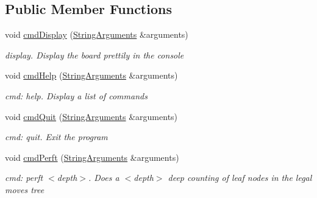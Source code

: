 \subsection*{Public Member Functions}
\begin{DoxyCompactItemize}
\item 
\mbox{\label{classCommandEngine_a76c27f3933326c261d709618d7f996c7}} 
void \hyperlink{classCommandEngine_a76c27f3933326c261d709618d7f996c7}{cmd\+Display} (\hyperlink{structStringArguments}{String\+Arguments} \&arguments)
\begin{DoxyCompactList}\small\item\em display. Display the board prettily in the console \end{DoxyCompactList}\item 
\mbox{\label{classCommandEngine_a1ce6ddfd0eb350cfdde728458329f67d}} 
void \hyperlink{classCommandEngine_a1ce6ddfd0eb350cfdde728458329f67d}{cmd\+Help} (\hyperlink{structStringArguments}{String\+Arguments} \&arguments)
\begin{DoxyCompactList}\small\item\em cmd\+: help. Display a list of commands \end{DoxyCompactList}\item 
\mbox{\label{classCommandEngine_ad82f0bf1cb89f7f43288ce379f97be04}} 
void \hyperlink{classCommandEngine_ad82f0bf1cb89f7f43288ce379f97be04}{cmd\+Quit} (\hyperlink{structStringArguments}{String\+Arguments} \&arguments)
\begin{DoxyCompactList}\small\item\em cmd\+: quit. Exit the program \end{DoxyCompactList}\item 
\mbox{\label{classCommandEngine_ac70f9158e992aa4d7567fa2fe47b09e7}} 
void \hyperlink{classCommandEngine_ac70f9158e992aa4d7567fa2fe47b09e7}{cmd\+Perft} (\hyperlink{structStringArguments}{String\+Arguments} \&arguments)
\begin{DoxyCompactList}\small\item\em cmd\+: perft $<$depth$>$. Does a $<$depth$>$ deep counting of leaf nodes in the legal moves tree \end{DoxyCompactList}\item 
\mbox{\label{classCommandEngine_ad6f3a8998e456a4efa626e32219e1406}} 

\end{DoxyCompactItemize}
